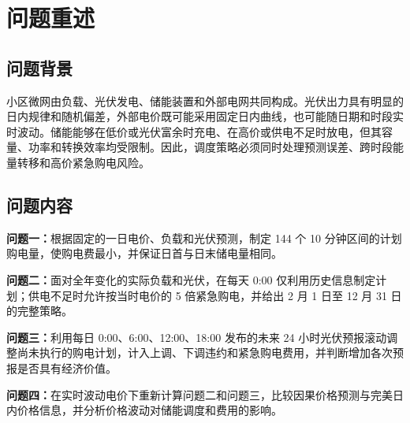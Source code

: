 \section{问题重述}

\subsection{问题背景}

小区微网由负载、光伏发电、储能装置和外部电网共同构成。光伏出力具有明显的日内规律和随机偏差，外部电价既可能采用固定日内曲线，也可能随日期和时段实时波动。储能能够在低价或光伏富余时充电、在高价或供电不足时放电，但其容量、功率和转换效率均受限制。因此，调度策略必须同时处理预测误差、跨时段能量转移和高价紧急购电风险。

\subsection{问题内容}

\textbf{问题一：}根据固定的一日电价、负载和光伏预测，制定 144 个 10 分钟区间的计划购电量，使购电费最小，并保证日首与日末储电量相同。

\textbf{问题二：}面对全年变化的实际负载和光伏，在每天 0:00 仅利用历史信息制定计划；供电不足时允许按当时电价的 5 倍紧急购电，并给出 2 月 1 日至 12 月 31 日的完整策略。

\textbf{问题三：}利用每日 0:00、6:00、12:00、18:00 发布的未来 24 小时光伏预报滚动调整尚未执行的购电计划，计入上调、下调违约和紧急购电费用，并判断增加各次预报是否具有经济价值。

\textbf{问题四：}在实时波动电价下重新计算问题二和问题三，比较因果价格预测与完美日内价格信息，并分析价格波动对储能调度和费用的影响。

